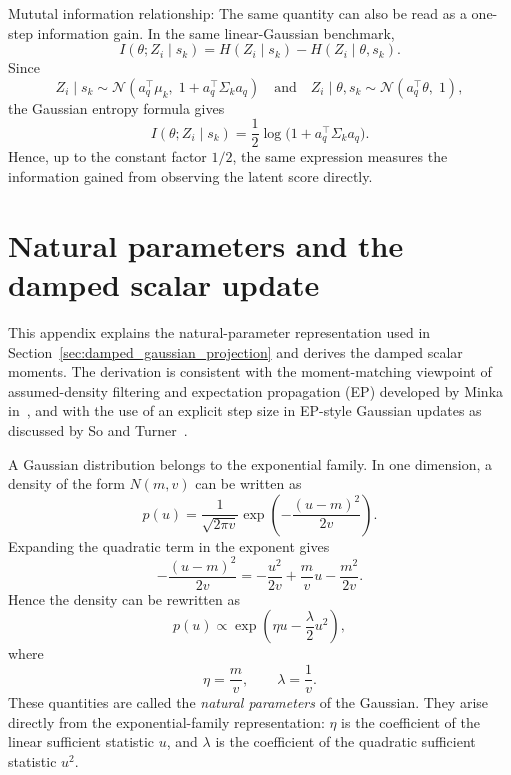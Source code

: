 \documentclass{article}
\begin{document}
\newpage

Mututal information relationship:
The same quantity can also be read as a one-step information gain. In the same
linear-Gaussian benchmark,
\begin{equation*}
I(\theta;Z_i\mid s_k)
=
H(Z_i\mid s_k)-H(Z_i\mid \theta,s_k).
\end{equation*}
Since
\begin{equation*}
Z_i\mid s_k \sim \mathcal N(a_q^\top\mu_k,\;1+a_q^\top\Sigma_k a_q)
\quad\text{and}\quad
Z_i\mid \theta,s_k \sim \mathcal N(a_q^\top\theta,\;1),
\end{equation*}
the Gaussian entropy formula gives
\begin{equation*}
I(\theta;Z_i\mid s_k)
=
\frac12\log\!\bigl(1+a_q^\top\Sigma_k a_q\bigr).
\end{equation*}
Hence, up to the constant factor $1/2$, the same expression measures the information
gained from observing the latent score directly.

\section{Natural parameters and the damped scalar update}
\label{app:natural_damping}

This appendix explains the natural-parameter representation used in
Section~\ref{sec:damped_gaussian_projection} and derives the damped scalar moments.
The derivation is consistent with the moment-matching viewpoint of assumed-density
filtering and expectation propagation (EP) developed by Minka
in~\cite{minka2001thesis,minka2001ep}, and with the use of an explicit step size
in EP-style Gaussian updates as discussed by So and
Turner~\cite{so2024fearless}.

A Gaussian distribution belongs to the exponential family. In one dimension, a
density of the form $N(m,v)$ can be written as
\[
p(u)
=
\frac{1}{\sqrt{2\pi v}}
\exp\!\left(
-\frac{(u-m)^2}{2v}
\right).
\]
Expanding the quadratic term in the exponent gives
\[
-\frac{(u-m)^2}{2v}
=
-\frac{u^2}{2v}+\frac{m}{v}u-\frac{m^2}{2v}.
\]
Hence the density can be rewritten as
\[
p(u)
\propto
\exp\!\left(
\eta u-\frac{\lambda}{2}u^2
\right),
\]
where
\[
\eta=\frac{m}{v},
\qquad
\lambda=\frac{1}{v}.
\]
These quantities are called the \emph{natural parameters} of the Gaussian. They arise directly from the exponential-family
representation: $\eta$ is the coefficient of the linear sufficient statistic
$u$, and $\lambda$ is the coefficient of the quadratic sufficient statistic
$u^2$.
\end{document}
